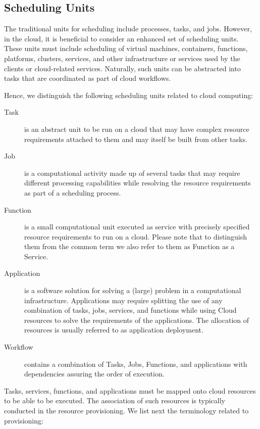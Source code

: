 \documentclass[final,5p,times,twocolumn]{elsarticle}
\begin{document}
\subsection{Scheduling Units}

The traditional units for scheduling include processes, tasks, and jobs. However, in the cloud, it is beneficial to consider an enhanced set of scheduling units. These units must include scheduling of virtual machines, containers, functions, platforms, clusters, services, and other infrastructure or services used by the clients or cloud-related services. Naturally, such units can be abstracted into tasks that are coordinated as part of cloud workflows.

Hence, we distinguish the following scheduling units related to cloud computing:

\begin{description}

\item[Task] is an abstract unit to be run on a cloud that may have complex resource requirements attached to them and may itself be built from other tasks. 

\item[Job] is a computational activity made up of several tasks that may require different processing capabilities while resolving the resource requirements as part of a scheduling process.

\item[Function] is a small computational unit executed as service with precisely specified resource requirements to run on a cloud. Please note that to distinguish them from the common term we also refer to them as Function as a Service.

\item[Application] is a software solution for solving a (large) problem in a computational infrastructure. Applications may require splitting the use of any combination of tasks, jobs, services, and functions while using Cloud resources to solve the requirements of the applications. The allocation of resources is usually referred to as application deployment.

\item[Workflow] contains a combination of Tasks, Jobs, Functions, and applications with dependencies assuring the order of execution.

\end{description}

Tasks, services, functions, and applications must be mapped
onto cloud resources to be able to be executed. The association of
such resources is typically conducted in the resource provisioning. We
list next the terminology related to provisioning:
\end{document}
